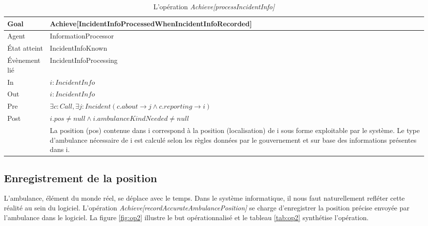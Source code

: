	\begin{table}
		\begin{tabularx}{\textwidth}{|l|X|} \hline
			Goal & Achieve[IncidentInfoProcessed\-WhenIncidentInfoRecorded] \\ \hline
			Agent & InformationProcessor \\ \hline
			État atteint & IncidentInfoKnown \\ \hline
			Évènement lié & IncidentInfoProcessing \\ \hline
			In & $i: IncidentInfo$ \\ \hline
			Out & $i: IncidentInfo$ \\ \hline
			Pre & $\exists c: Call, \exists j: Incident (c.about \rightarrow j \wedge c.reporting \rightarrow i)$ \\ \hline
			Post & $i.pos \neq null \wedge i.ambulanceKindNeeded \neq null $  \\
				 & La position (pos) contenue dans i correspond à la position (localisation) de i sous forme exploitable par le système. 
				  Le type d'ambulance nécessaire de i est calculé selon les règles données par le gouvernement et sur base des 
				  informations présentes dans i. \\ \hline
		\end{tabularx}
		\caption{L'opération \textit{Achieve[processIncidentInfo]}}\label{tab:op1}
	\end{table}

\newpage
\subsection{Enregistrement de la position}
	
	L'ambulance, élément du monde réel, se déplace avec le temps. Dans le système
	informatique, il nous faut naturellement refléter cette réalité au 
	sein du logiciel. L'opération \textit{Achieve[recordAccurateAmbulancePosition]}
	se charge d'enregistrer la position précise envoyée par l'ambulance
	dans le logiciel. La figure \ref{fig:op2} illustre
	le but opérationnalisé et le tableau \ref{tab:op2} synthétise l'opération.
	
	\vfill
	\vfill
	
